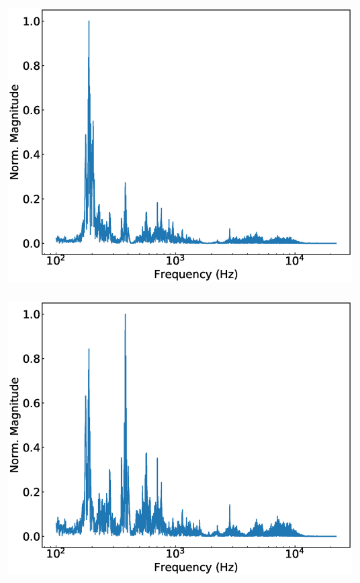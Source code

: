 \documentclass{scrartcl}			%
\begin{document}
\begin{figure}[H]
\centering
	 \begin{subfigure}[b]{0.49\linewidth}
    		\includegraphics[width=\linewidth]{imgs/filtered_3_fft.eps}
   		 \label{fig:ci_3} 
   		 \end{subfigure}
   		 \begin{subfigure}[b]{0.49\linewidth}
    		\includegraphics[width=\linewidth]{imgs/filtered_6_fft.eps}
   		 \label{fig:ci_3} 
   		 \end{subfigure}

\end{figure}
\end{document}
